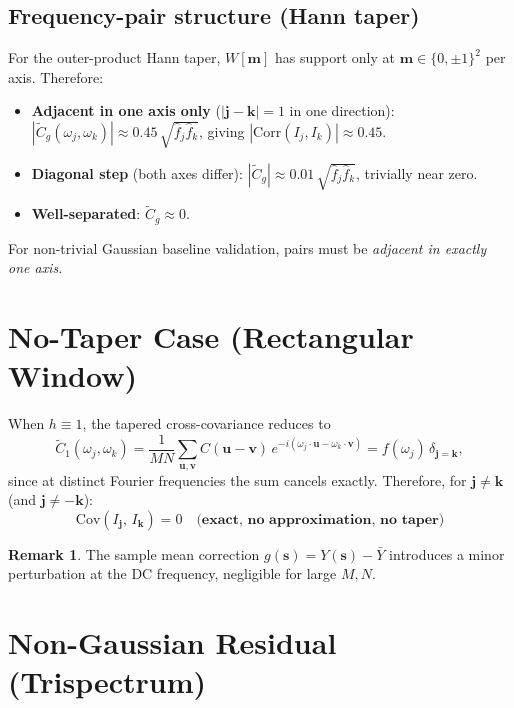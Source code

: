 \documentclass[12pt]{article}
\theoremstyle{definition}
\newtheorem{remark}{Remark}
\begin{document}
\subsection{Frequency-pair structure (Hann taper)}

For the outer-product Hann taper, $W[\mathbf{m}]$ has support only at
$\mathbf{m} \in \{0,\pm1\}^2$ per axis. Therefore:
\begin{itemize}
  \item \textbf{Adjacent in one axis only} ($|\mathbf{j}-\mathbf{k}|=1$ in one direction):
        $|\tilde{C}_g(\omega_j,\omega_k)| \approx 0.45\,\sqrt{\hat{f}_j\hat{f}_k}$,
        giving $|\mathrm{Corr}(I_j,I_k)| \approx 0.45$.
  \item \textbf{Diagonal step} (both axes differ):
        $|\tilde{C}_g| \approx 0.01\,\sqrt{\hat{f}_j\hat{f}_k}$,
        trivially near zero.
  \item \textbf{Well-separated}: $\tilde{C}_g \approx 0$.
\end{itemize}
For non-trivial Gaussian baseline validation, pairs must be
\emph{adjacent in exactly one axis}.


\section{No-Taper Case (Rectangular Window)}
\label{sec:no_taper}

When $h \equiv 1$, the tapered cross-covariance reduces to
\[
  \tilde{C}_1(\omega_j,\omega_k)
  = \frac{1}{MN}\sum_{\mathbf{u},\mathbf{v}} C(\mathbf{u}-\mathbf{v})\,
    e^{-i(\omega_j\cdot\mathbf{u}-\omega_k\cdot\mathbf{v})}
  = f(\omega_j)\,\delta_{\mathbf{j}=\mathbf{k}},
\]
since at distinct Fourier frequencies the sum cancels exactly.
Therefore, for $\mathbf{j} \neq \mathbf{k}$ (and $\mathbf{j} \neq -\mathbf{k}$):
\[
\boxed{
  \mathrm{Cov}(I_{\mathbf{j}},\, I_{\mathbf{k}}) = 0
  \quad\textbf{(exact, no approximation, no taper)}
}
\]

\begin{remark}
The sample mean correction $g(\mathbf{s}) = Y(\mathbf{s}) - \bar{Y}$ introduces
a minor perturbation at the DC frequency, negligible for large $M,N$.
\end{remark}


\section{Non-Gaussian Residual (Trispectrum)}
\label{sec:nongauss}
\end{document}
